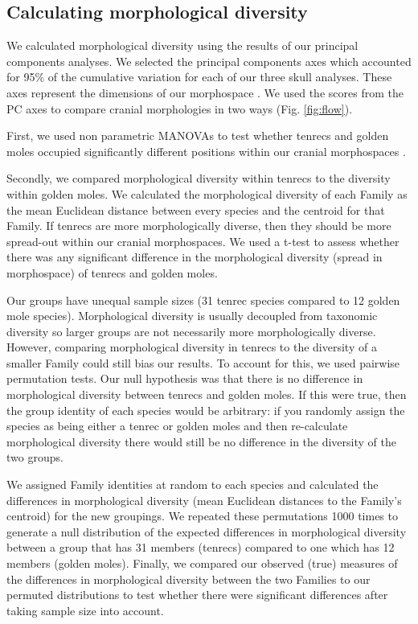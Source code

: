 \documentclass[12pt,a4paper]{article}
\begin{document}
	
\subsection{Calculating morphological diversity}

	We calculated morphological diversity using the results of our principal components analyses. We selected the principal components axes which accounted for 95\% of the cumulative variation for each of our three skull analyses. These axes represent the dimensions of our morphospace \citep{Polly2013}. We used the scores from the PC axes to compare cranial morphologies in two ways (Fig. \ref{fig:flow}).
	
	First, we used non parametric MANOVAs \citep{Anderson2001} to test whether tenrecs and golden moles occupied significantly different positions within our cranial morphospaces \citep[e.g][]{Serb2011, Ruta2013}.
	
	Secondly, we compared morphological diversity within tenrecs to the diversity within golden moles. We calculated the morphological diversity of each Family as the mean Euclidean distance between every species and the centroid for that Family. If tenrecs are more morphologically diverse, then they should be more spread-out within our cranial morphospaces. We used a t-test to assess whether there was any significant difference in the morphological diversity (spread in morphospace) of tenrecs and golden moles.
	
	Our groups have unequal sample sizes (31 tenrec species compared to 12 golden mole species). Morphological diversity is usually decoupled from taxonomic diversity \citep[e.g.][]{Ruta2013, Hopkins2013} so larger groups are not necessarily more morphologically diverse. However, comparing morphological diversity in tenrecs to the diversity of a smaller Family could still bias our results. To account for this, we used pairwise permutation tests. Our null hypothesis was that there is no difference in morphological diversity between tenrecs and golden moles. If this were true, then the group identity of each species would be arbitrary: if you randomly assign the species as being either a tenrec or golden moles and then re-calculate morphological diversity there would still be no difference in the diversity of the two groups. 
	
	We assigned Family identities at random to each species and calculated the differences in morphological diversity (mean Euclidean distances to the Family's centroid) for the new groupings. We repeated these permutations 1000 times to generate a null distribution of the expected differences in morphological diversity between a group that has 31 members (tenrecs) compared to one which has 12 members (golden moles). Finally, we compared our observed (true) measures of the differences in morphological diversity between the two Families to our permuted distributions to test whether there were significant differences after taking sample size into account.
	
\end{document}
